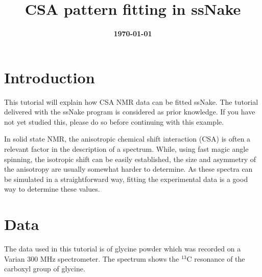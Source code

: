 \documentclass[11pt,a4paper]{article}
\title{\color{black}\fontfamily{SourceSansPro-LF}\bfseries CSA pattern fitting in ssNake}
\author{}
\date{\color{black}\fontfamily{SourceSansPro-LF}\bfseries \today}
\begin{document}

\maketitle

\section{Introduction}
This tutorial will explain how CSA NMR data can be fitted ssNake.
The tutorial delivered with the ssNake program is considered as prior knowledge. If you have not yet
studied this, please do so before continuing with this example.

In solid state NMR, the anisotropic chemical shift interaction (CSA) is often a relevant factor in the description of a spectrum.
While, using fast magic angle spinning, the isotropic shift can be easily established, the size and asymmetry of the anisotropy are usually somewhat harder to determine.
As these spectra can be simulated in a straightforward way, fitting the experimental data is a good way to determine these values.


\section{Data}
The data used in this tutorial is of glycine powder which was recorded on a Varian 300 MHz spectrometer.
The spectrum shows the $^{13}$C resonance of the carboxyl group of glycine.
\end{document}
